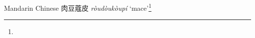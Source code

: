 \begin{etymology}\label{ety:roudoukoupi}
Mandarin Chinese {肉豆蔻皮} \textit{ròudòukòupí} `mace'\footnote{}
\end{etymology}